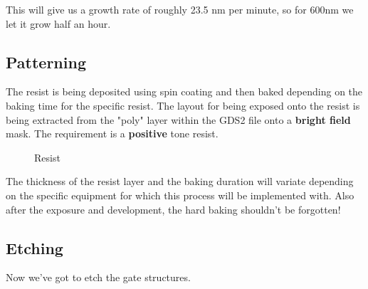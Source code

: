 This will give us a growth rate of roughly 23.5 nm per minute, so for 600nm we let it grow half an hour.

\newpage

\subsection{Patterning}

The resist is being deposited using spin coating and then baked depending on the baking time for the specific resist.
The layout for being exposed onto the resist is being extracted from the "poly" layer within the GDS2 file onto a \textbf{bright field} mask.
The requirement is a \textbf{positive} tone resist.

\begin{figure}[H]
	\centering
	\begin{tikzpicture}[node distance = 3cm, auto, thick,scale=\CrossAndTopSection, every node/.style={transform shape}]
		
	\end{tikzpicture}
	\begin{tikzpicture}[node distance = 3cm, auto, thick,scale=\CrossAndTopSection, every node/.style={transform shape}]
		
	\end{tikzpicture}
	\begin{tikzpicture}[node distance = 3cm, auto, thick,scale=\CrossAndTopSection, every node/.style={transform shape}]
		
	\end{tikzpicture}
	\begin{tikzpicture}[node distance = 3cm, auto, thick,scale=\CrossAndTopSection, every node/.style={transform shape}]
		
	\end{tikzpicture}
	\caption{Resist}
\end{figure}

The thickness of the resist layer and the baking duration will variate depending on the specific equipment for which this process will be implemented with.
Also after the exposure and development, the hard baking shouldn't be forgotten!


\subsection{Etching}

Now we've got to etch the gate structures.

